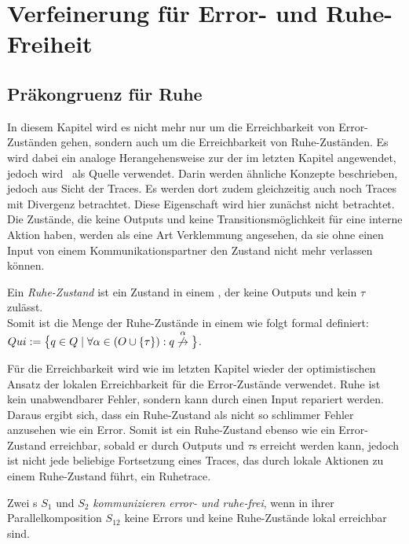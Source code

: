 \chapter{Verfeinerung für Error- und Ruhe-Freiheit}

\section{Präkongruenz für Ruhe}

In diesem Kapitel wird es nicht mehr nur um die Erreichbarkeit von
Error-Zuständen gehen, sondern auch um die Erreichbarkeit von
Ruhe-Zuständen. Es wird dabei ein analoge Herangehensweise zur der im letzten
Kapitel angewendet, jedoch wird~\cite{Chilton2013} als Quelle verwendet. Darin
werden ähnliche Konzepte beschrieben, jedoch aus Sicht der Traces. Es werden
dort zudem gleichzeitig auch noch Traces mit Divergenz betrachtet. Diese
Eigenschaft wird hier zunächst nicht betrachtet.\\
Die Zustände, die keine Outputs und keine Transitionsmöglichkeit für
eine interne Aktion haben, werden als eine Art Verklemmung angesehen, da sie
ohne einen Input von einem Kommunikationspartner den Zustand nicht mehr
verlassen können.

\begin{Def}[Ruhe]
  Ein \emph{Ruhe-Zustand} ist ein Zustand in einem \EIO{}, der keine
  Outputs und kein $\tau$ zulässt.\\
  Somit ist die Menge der Ruhe-Zustände in einem \EIO{} wie folgt formal
  definiert: $Qui:=\big\{q\in Q\mid \forall \alpha\in (O\cup \{\tau\}): q
  \overset{\alpha}{\not{\hspace{-0.1cm}\rightarrow}}\big\}$.
\end{Def}

Für die Erreichbarkeit wird wie im letzten Kapitel wieder der
optimistischen Ansatz der lokalen Erreichbarkeit für die Error-Zustände
verwendet. Ruhe ist kein unabwendbarer Fehler, sondern kann durch einen Input
repariert werden. Daraus ergibt sich, dass ein Ruhe-Zustand als nicht so
\glqq{}schlimmer Fehler\grqq{} anzusehen wie ein Error. Somit ist ein
Ruhe-Zustand ebenso wie ein Error-Zustand erreichbar, sobald er durch Outputs
und $\tau$s erreicht werden kann, jedoch ist nicht jede beliebige Fortsetzung
eines Traces, das durch lokale Aktionen zu einem Ruhe-Zustand führt, ein
Ruhetrace.

\begin{Def}
  Zwei \EIO{}s $S_1$ und $S_2$ \emph{kommunizieren error- und ruhe-frei}, wenn
  in ihrer Parallelkomposition $S_{12}$ keine Errors und keine Ruhe-Zustände
  lokal erreichbar sind.
\end{Def}

